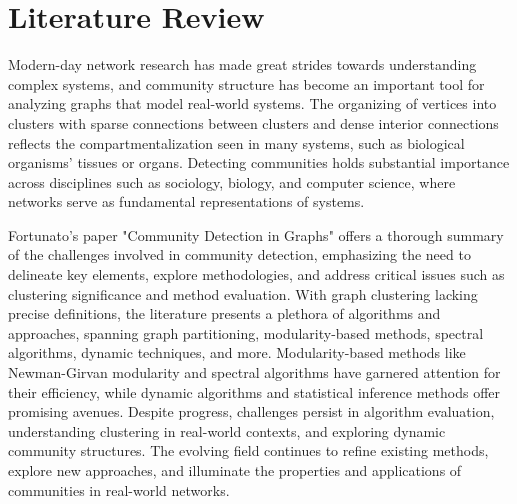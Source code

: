 \section{Literature Review}
Modern-day network research has made great strides towards understanding complex systems, and community structure has become an important tool for analyzing graphs that model real-world systems. The organizing of vertices into clusters with sparse connections between clusters and dense interior connections reflects the compartmentalization seen in many systems, such as biological organisms' tissues or organs. Detecting communities holds substantial importance across disciplines such as sociology, biology, and computer science, where networks serve as fundamental representations of systems.

Fortunato's paper "Community Detection in Graphs" \cite{cd_in_graphs_Fortunato} offers a thorough summary of the challenges involved in community detection, emphasizing the need to delineate key elements, explore methodologies, and address critical issues such as clustering significance and method evaluation. With graph clustering lacking precise definitions, the literature presents a plethora of algorithms and approaches, spanning graph partitioning, modularity-based methods, spectral algorithms, dynamic techniques, and more. Modularity-based methods like Newman-Girvan modularity and spectral algorithms have garnered attention for their efficiency, while dynamic algorithms and statistical inference methods offer promising avenues. Despite progress, challenges persist in algorithm evaluation, understanding clustering in real-world contexts, and exploring dynamic community structures. The evolving field continues to refine existing methods, explore new approaches, and illuminate the properties and applications of communities in real-world networks.

